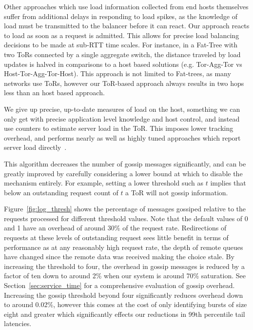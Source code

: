 Other approaches which use load information collected from end hosts
themselves suffer from additional delays in responding to load spikes,
as the knowledge of load must be transmitted to the balancer before it
can react. Our approach reacts to load as soon as a request is
admitted. This allows for precise load balancing decisions to be made
at sub-RTT time scales. 
For instance, in a Fat-Tree with two ToRs connected by a single
aggregate switch, the distance traveled by load updates is halved in
comparisons to a host based solutions (e.g. Tor-Agg-Tor vs
Host-Tor-Agg-Tor-Host). This approach is not limited to Fat-trees,
as
many networks use ToRs, however our ToR-based approach always results
in two hops less than an host based approach.

We give up precise, up-to-date measures of load on the host, something we can
only get with precise application level knowledge and host control, and instead
use counters to estimate server load in the ToR. This imposes lower tracking
overhead, and performs nearly as well as highly tuned approaches which report
server load directly~\cite[Figure. 15 (proactive)]{racksched}.

This algorithm decreases the number of gossip messages
significantly, and can be greatly improved by carefully considering a
lower bound at which to disable the mechanism entirely.
For example, setting a lower
threshold such as $t$ implies that below an outstanding request count of
$t$ a ToR will not gossip information.


Figure~\ref{fig:log_thresh} shows the percentage of messages gossiped relative
to the requests processed for different threshold values.  Note that the
default values of 0 and 1 have an overhead of around 30\% of the request rate.
Redirections of requests at these levels of outstanding request sees little
benefit in terms of performance as at any reasonably high request rate, the
depth of remote queues have changed since the remote data was received making
the choice stale. By increasing the threshold to four, the overhead in gossip
messages is reduced by a factor of ten down to around 2\% when our system is
around 70\% saturation. See Section~\ref{sec:service_time} for a comprehensive
evaluation of gossip overhead. Increasing the gossip threshold beyond four
significantly reduces overhead down to around 0.02\%, however this comes at the
cost of only identifying bursts of size eight and greater which significantly
effects our reductions in 99th percentile tail latencies.

